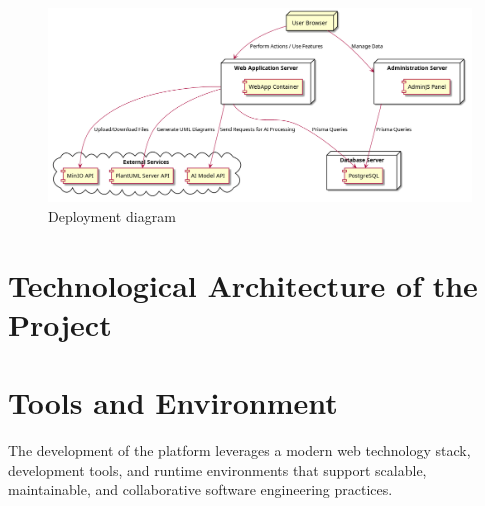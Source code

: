 \begin{figure}[H]
    \centering
    \includegraphics[width=\textwidth]{./diagrams/deployment/d2.png}
    \caption{Deployment diagram}
    \label{fig:deployment}
\end{figure}

\section{Technological Architecture of the Project}

\section{Tools and Environment}
The development of the platform leverages a modern web technology stack, development tools, and runtime environments that support scalable, maintainable, and collaborative software engineering practices.

